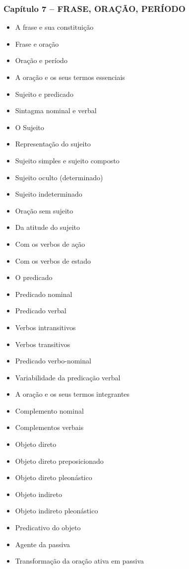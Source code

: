 \documentclass[a4paper,12pt]{article}[abntex2]
\begin{document}
\subsubsection*{Capítulo 7 – FRASE, ORAÇÃO, PERÍODO}
\begin{itemize}
    \item A frase e sua constituição
    \item Frase e oração
    \item Oração e período
    \item A oração e os seus termos essenciais
    \item Sujeito e predicado
    \item Sintagma nominal e verbal
    \item O Sujeito
    \item Representação do sujeito
    \item Sujeito simples e sujeito composto
    \item Sujeito oculto (determinado)
    \item Sujeito indeterminado
    \item Oração sem sujeito
    \item Da atitude do sujeito
    \item Com os verbos de ação
    \item Com os verbos de estado
    \item O predicado
    \item Predicado nominal
    \item Predicado verbal
    \item Verbos intransitivos
    \item Verbos transitivos
    \item Predicado verbo-nominal
    \item Variabilidade da predicação verbal
    \item A oração e os seus termos integrantes
    \item Complemento nominal
    \item Complementos verbais
    \item Objeto direto
    \item Objeto direto preposicionado
    \item Objeto direto pleonástico
    \item Objeto indireto
    \item Objeto indireto pleonástico
    \item Predicativo do objeto
    \item Agente da passiva
    \item Transformação da oração ativa em passiva

\end{itemize}
\end{document}
